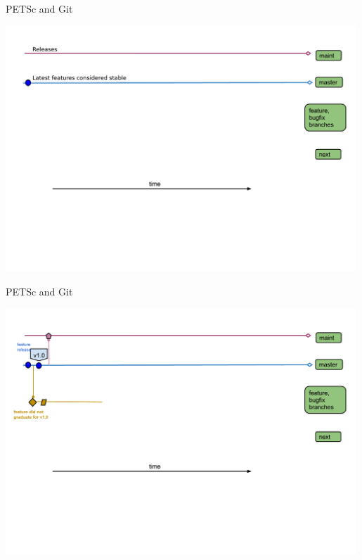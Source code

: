 \begin{frame}{PETSc and Git}
  \begin{center}
    \includegraphics[width=0.99\textwidth]{figures/gitworkflows-50}
  \end{center}
\end{frame}

\begin{frame}{PETSc and Git}
  \begin{center}
    \includegraphics[width=0.99\textwidth]{figures/gitworkflows-55}
  \end{center}
\end{frame}

